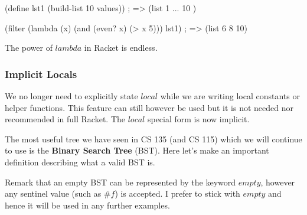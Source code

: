 \begin{code}[Lisp]
(define lst1 (build-list 10 values)) ; => (list 1 ... 10 )

(filter (lambda (x) (and (even? x) (> x 5))) lst1) ; => (list 6 8 10)
\end{code}

The power of $lambda$ in Racket is endless.\\


\subsubsection*{Implicit Locals}

We no longer need to explicitly state $local$ while we are writing local constants or helper functions. This feature can still however be used but it is not needed nor recommended in full Racket. The $local$ special form is now implicit.


The most useful tree we have seen in CS 135 (and CS 115) which we will continue to use is the \textbf{Binary Search Tree} (BST). Here let's make an important definition describing what a valid BST is.\\


Remark that an empty BST can be represented by the keyword $empty$, however any sentinel value (such as $\#f$) is accepted. I prefer to stick with $empty$ and hence it will be used in any further examples.\\

